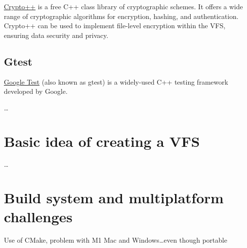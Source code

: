 \href{https://www.cryptopp.com/}{Crypto++} is a free C++ class library of cryptographic schemes.
It offers a wide range of cryptographic algorithms for encryption, hashing, and authentication.
Crypto++ can be used to implement file-level encryption within the VFS, ensuring data security and privacy.

\subsection{Gtest}\label{subsec:gtest}

\href{https://github.com/google/googletest}{Google Test} (also known as gtest) is a widely-used C++ testing framework developed by Google.

\ldots

\section{Basic idea of creating a VFS}\label{sec:basic-idea-of-creating-a-vfs}

\ldots

\section{Build system and multiplatform challenges}\label{sec:build-system-and-multiplatform-challenges}

Use of CMake, problem with M1 Mac and Windows\ldots even though portable